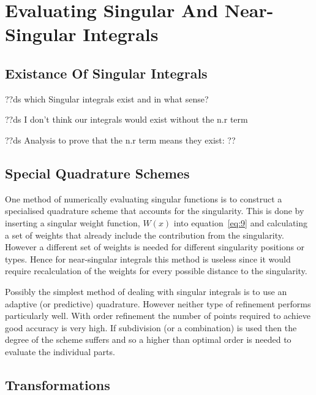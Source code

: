 
\section{Evaluating Singular And Near-Singular Integrals}

\subsection{Existance Of Singular Integrals}
??ds which Singular integrals exist and in what sense?

??ds I don't think our integrals would exist without the n.r term

??ds Analysis to prove that the n.r term means they exist: ??


\subsection{Special Quadrature Schemes}

One method of numerically evaluating singular functions is to construct a specialised quadrature scheme that accounts for the singularity. This is done by inserting a singular weight function, $W(x)$ into equation~\eqref{eq:9} and calculating a set of weights that already include the contribution from the singularity.\cite{Kolm2001} However a different set of weights is needed for different singularity positions or types. Hence for near-singular integrals this method is useless since it would require recalculation of the weights for every possible distance to the singularity.

Possibly the simplest method of dealing with singular integrals is to use an adaptive (or predictive) quadrature. However neither type of refinement performs particularly well. With order refinement the number of points required to achieve good accuracy is very high. If subdivision (or a combination) is used then the degree of the scheme suffers and so a higher than optimal order is needed to evaluate the individual parts.\cite{Telles1987}

\subsection{Transformations}

